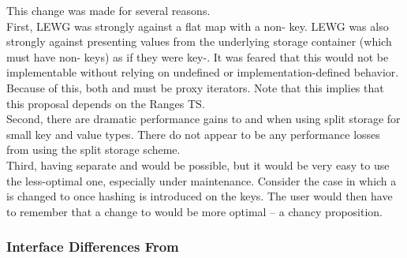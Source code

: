 This change was made for several reasons.\\

First, LEWG was strongly against a flat map  with a
non- key.  LEWG was also strongly against presenting values from
the underlying storage container (which must have non- keys) as if
they were key-.  It was feared that this would not be
implementable without relying on undefined or implementation-defined behavior.
Because of this, both  and  must be proxy
iterators.  Note that this implies that this proposal depends on the Ranges TS.\\

Second, there are dramatic performance gains to  and
 when using split storage for small key and value types.  There
do not appear to be any performance losses from using the split storage scheme.\\

Third, having separate  and  would be
possible, but it would be very easy to use the less-optimal one, especially
under maintenance.  Consider the case in which a  is changed to  once hashing is introduced on
the keys.  The user would then have to remember that a change to
 would be more optimal -- a chancy proposition.

\subsubsection{Interface Differences From }

